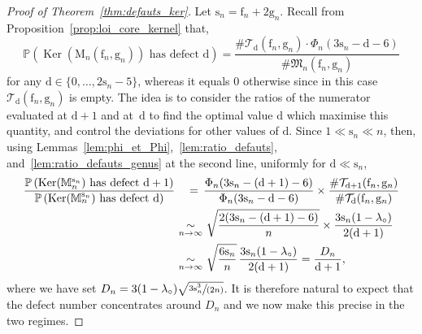 \documentclass[10pt]{amsart}
\theoremstyle{plain}
\theoremstyle{definition}
\theoremstyle{remark}
\renewcommand{\P}{\mathbb{P}}
\newcommand{\Map}{\mathrm{M}}
\newcommand{\Mapb}{\mathbb{M}}
\newcommand{\face}{\mathrm{f}}
\newcommand{\defect}{\mathrm{d}}
\newcommand{\gen}{\mathrm{g}}
\newcommand{\spar}{\mathrm{s}}
\DeclareMathOperator{\Ker}{Ker}
\newcommand{\equi}[1][n]{\,\mathop{\sim}^{}_{#1 \to \infty}\,}
\begin{document}
\begin{proof}[Proof of Theorem~\ref{thm:defauts_ker}]
Let $\spar_n = \face_n+2\gen_n$.
Recall from Proposition~\ref{prop:loi_core_kernel} that,
\[
\P\left(\Ker(\Map_n(\face_n,\gen_n)) \textrm{ has defect } \defect\right)
= \frac{\# \mathcal{T}_\defect(\face_n,\gen_n) \cdot \Phi_{n}(3\spar_n-\defect-6 )}{\# \mathfrak{M}_n(\face_n,\gen_n)}
\]
for any $\defect \in\{0, \dots, 2\spar_n-5\}$, whereas it equals $0$ otherwise since in this case $\mathcal{T}_\defect(\face_n,\gen_n)$ is empty.
The idea is to consider the ratios of the numerator evaluated at $\defect+1$ and at~$\defect$ to find the optimal value $\defect$ which maximise this quantity, and control the deviations for other values of $\defect$.
Since $ 1 \ll \spar_{n} \ll n$, then, using Lemmas~\ref{lem:phi_et_Phi},~\ref{lem:ratio_defauts}, and~\ref{lem:ratio_defauts_genus} at the second line, uniformly for $ \defect \ll \spar_{n}$,
\begin{align}
\frac{\P\left(\Ker(\Mapb_n^{\spar_n}) \textrm{ has defect } \defect+1\right)}{\P\left(\Ker(\Mapb_n^{\spar_n}) \textrm{ has defect } \defect\right)}
&\quad=\, \frac{\Phi_{n}(3\spar_n-(\defect+1)-6 )}{\Phi_{n}(3\spar_n-\defect-6 )} \times \frac{ \# \mathcal{T}_{ \defect +1}(\face_n,\gen_n)}{{ \# \mathcal{T}_{ \defect}(\face_n,\gen_n)}}
\notag\\
&\equi \sqrt{\frac{2(3\spar_n - (\defect+1) - 6)}{n}} \times \frac{3 \spar_n(1-\lambda_{\circ})}{2 (\defect+1)}
\notag\\
&\equi \sqrt{\frac{6\spar_n}{n}}\, \frac{3 \spar_n(1-\lambda_{\circ})}{2 (\defect+1)}
= \frac{D_n}{\defect+1}, \label{eq:ratio_estimee}
\end{align}
where we have set $D_n = 3 (1-\lambda_{\circ}) \sqrt{\sfrac{3\spar_n^3}{(2n)}}$. It is therefore natural to expect that the defect number concentrates around $D_n$ and we now make this precise in the two regimes.


\end{proof}
\end{document}
